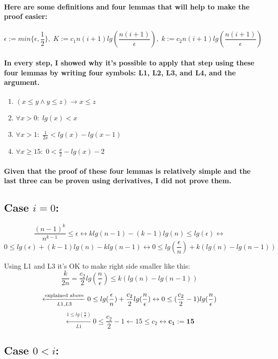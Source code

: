 \documentclass[oneside]{book}
\newcommand{\myparagraph}[1]{\paragraph{\textnormal{#1}}}
\begin{document}
\myparagraph{
Here are some definitions and four lemmas that will help to make the proof easier:
}

$$\epsilon:=min\{\epsilon, \frac{1}{2}\}, \; K:=c_1n(i+1)lg(\frac{n(i+1)}{\epsilon}),\; k:=c_2n(i+1)lg(\frac{n(i+1)}{\epsilon})$$

\myparagraph{
In every step, I showed why it's possible to apply that step using these four lemmas by writing four symbols: L1, L2, L3, and L4, and the argument.
}

\begin{enumerate}
    \item{$(x \le y \land y \le z) \rightarrow x \le z$}
    \item{$\forall x > 0: \; lg(x) < x$}
    \item{$\forall x > 1: \; \frac{1}{2x} < lg(x)-lg(x-1)$}
    \item{$\forall x \ge 15: \; 0 < \frac{x}{2} - lg(x) - 2$}
\end{enumerate}

\myparagraph{
Given that the proof of these four lemmas is relatively simple and the last three can be proven using derivatives, I did not prove them.
}

\subsection{Case $i = 0$:}

$$\frac{(n-1)^k}{n^{k-1}} \le \epsilon\leftrightarrow  k lg(n-1) - (k-1) lg(n) \le lg(\epsilon) \leftrightarrow $$
$$0 \le lg(\epsilon) + (k-1) lg(n) - k lg(n-1) \leftrightarrow 0 \le lg(\frac{\epsilon}{n}) + k(lg(n) - lg(n - 1))$$
\begin{tcolorbox}
Using L1 and L3 it's OK to make right side smaller like this:\newline
$$\frac{k}{2n} = \frac{c_2}{2}lg(\frac{n}{\epsilon}) \le k(lg(n) - lg(n-1))$$
\end{tcolorbox}
$$\xleftarrow[L1, L3]{\textnormal{explained above}} 0 \le lg(\frac{\epsilon}{n}) + \frac{c_2}{2}lg(\frac{n}{\epsilon}) \leftrightarrow 0 \le (\frac{c_2}{2} - 1)lg(\frac{n}{\epsilon})$$
$$\xleftarrow[L1]{1 \le lg(\frac{n}{\epsilon})} 0 \le \frac{c_2}{2} - 1 \leftarrow 15 \le c_2 \leftrightarrow \mathbf{c_1 := 15}$$

\subsection{Case $0 < i$:}
\end{document}
